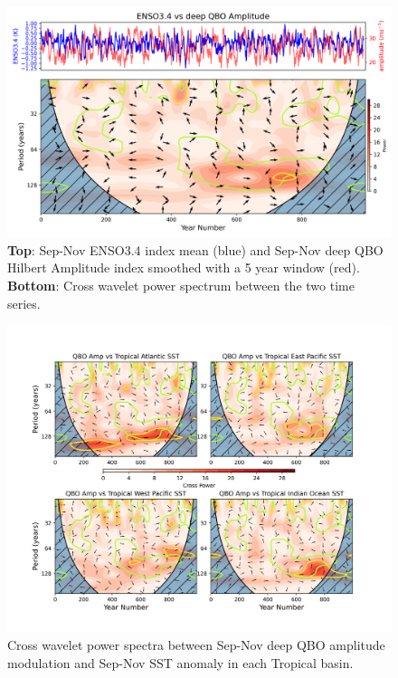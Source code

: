 \documentclass[wcd, manuscript]{copernicus}
\begin{document}
\begin{center}
\begin{figure}[h!]
\includegraphics[width = 0.8\linewidth]{new_changed_figures/cross_power_ENSO_vs_deep_QBO_amp_5yr_mean_new_levels.png}
\caption{\textbf{Top}: Sep-Nov ENSO3.4 index  mean (blue) and Sep-Nov deep QBO Hilbert Amplitude index smoothed with a 5 year window (red). \textbf{Bottom}: Cross wavelet power spectrum between the two time series.}
\label{fig1}
\end{figure}
\end{center}

\begin{center}
\begin{figure}[h!]
\includegraphics[width = \linewidth]{new_changed_figures/QBO_amp_vs_trop_SSTs_crosspower_new_levels.png}
\caption{Cross wavelet power spectra between Sep-Nov deep QBO amplitude modulation and Sep-Nov SST anomaly in each Tropical basin.}
\label{fig1}
\end{figure}
\end{center}
\end{document}
